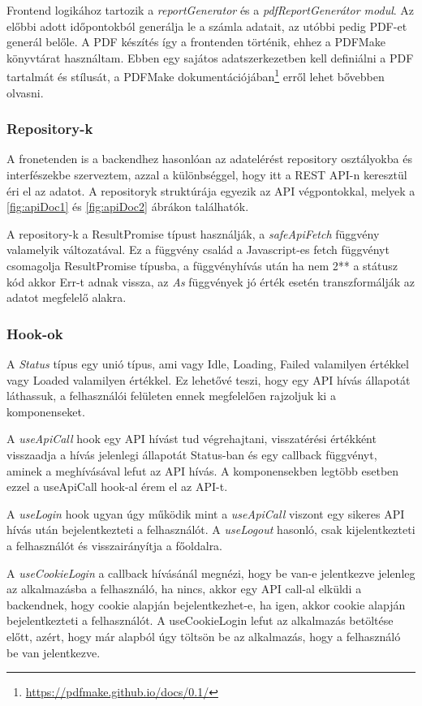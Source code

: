 Frontend logikához tartozik a \textit{reportGenerator} és a \textit{pdfReportGenerátor modul}. Az előbbi adott időpontokból generálja le a számla adatait, az utóbbi pedig PDF-et generál belőle. A PDF készítés így a frontenden történik, ehhez a PDFMake könyvtárat használtam. Ebben egy sajátos adatszerkezetben kell definiálni a PDF tartalmát és stílusát, a PDFMake dokumentációjában\footnote{\url{https://pdfmake.github.io/docs/0.1/}} erről lehet bővebben olvasni.

\subsubsection{Repository-k}

A fronetenden is a backendhez hasonlóan az adatelérést repository osztályokba és interfészekbe szerveztem, azzal a különbséggel, hogy itt a REST API-n keresztül éri el az adatot. A repositoryk struktúrája egyezik az API végpontokkal, melyek a \ref{fig:apiDoc1} és \ref{fig:apiDoc2} ábrákon találhatók.

A repository-k a ResultPromise típust használják, a \textit{safeApiFetch} függvény valamelyik változatával. Ez a függvény család a Javascript-es fetch függvényt csomagolja ResultPromise típusba, a függvényhívás után ha nem 2** a státusz kód akkor Err-t adnak vissza, az \textit{As} függvények jó érték esetén transzformálják az adatot megfelelő alakra. 

\subsubsection{Hook-ok}

A \textit{Status} típus egy unió típus, ami vagy Idle, Loading, Failed valamilyen értékkel vagy Loaded valamilyen értékkel. Ez lehetővé teszi, hogy egy API hívás állapotát láthassuk, a felhasználói felületen ennek megfelelően rajzoljuk ki a komponenseket.

A \textit{useApiCall} hook egy API hívást tud végrehajtani, visszatérési értékként visszaadja a hívás jelenlegi állapotát Status-ban és egy callback függvényt, aminek a meghívásával lefut az API hívás. A komponensekben legtöbb esetben ezzel a useApiCall hook-al érem el az API-t.

A \textit{useLogin} hook ugyan úgy működik mint a \textit{useApiCall} viszont egy sikeres API hívás után bejelentkezteti a felhasználót. A \textit{useLogout} hasonló, csak kijelentkezteti a felhasználót és visszairányítja a főoldalra.

A \textit{useCookieLogin} a callback hívásánál megnézi, hogy be van-e jelentkezve jelenleg az alkalmazásba a felhasználó, ha nincs, akkor egy API call-al elküldi a backendnek, hogy cookie alapján bejelentkezhet-e, ha igen, akkor cookie alapján bejelentkezteti a felhasználót. A useCookieLogin lefut az alkalmazás betöltése előtt, azért, hogy már alapból úgy töltsön be az alkalmazás, hogy a felhasználó be van jelentkezve.

